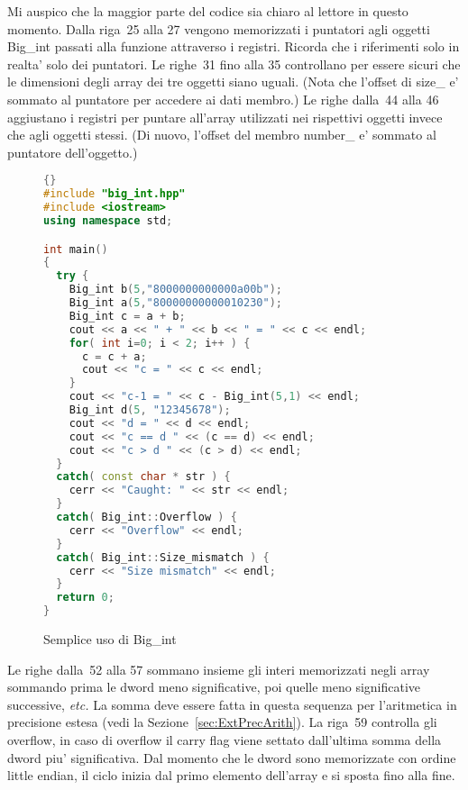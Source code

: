 Mi auspico che la maggior parte del codice sia chiaro al lettore in 
questo momento. Dalla riga~25 alla 27 vengono memorizzati i puntatori
agli oggetti {\code Big\_int} passati alla funzione attraverso i
registri. Ricorda che i riferimenti solo in realta' solo dei puntatori.
Le righe~31 fino alla 35 controllano per essere sicuri che le dimensioni
degli array dei tre oggetti siano uguali. (Nota che l'offset di
{\code size\_} e' sommato al puntatore per accedere ai dati membro.)
Le righe dalla~44 alla 46 aggiustano i registri per puntare all'array
utilizzati nei rispettivi oggetti invece che agli oggetti stessi. (Di
nuovo, l'offset del membro {\code number\_} e' sommato al puntatore
dell'oggetto.)

\begin{figure}[tp]
\begin{lstlisting}[language=C++, frame=tlrb]{}
#include "big_int.hpp"
#include <iostream>
using namespace std;

int main()
{
  try {
    Big_int b(5,"8000000000000a00b");
    Big_int a(5,"80000000000010230");
    Big_int c = a + b;
    cout << a << " + " << b << " = " << c << endl;
    for( int i=0; i < 2; i++ ) {
      c = c + a;
      cout << "c = " << c << endl;
    }
    cout << "c-1 = " << c - Big_int(5,1) << endl;
    Big_int d(5, "12345678");
    cout << "d = " << d << endl;
    cout << "c == d " << (c == d) << endl;
    cout << "c > d " << (c > d) << endl;
  }
  catch( const char * str ) {
    cerr << "Caught: " << str << endl;
  }
  catch( Big_int::Overflow ) {
    cerr << "Overflow" << endl;
  }
  catch( Big_int::Size_mismatch ) {
    cerr << "Size mismatch" << endl;
  }
  return 0;
}
\end{lstlisting}
\caption{ Semplice uso di {\code Big\_int} \label{fig:BigIntEx}}
\end{figure}

Le righe dalla~52 alla 57 sommano insieme gli interi memorizzati negli array
sommando prima le dword meno significative, poi quelle meno significative
successive, \emph{etc.} La somma deve essere fatta in questa sequenza per
l'aritmetica in precisione estesa (vedi la Sezione~\ref{sec:ExtPrecArith}). La
riga~59 controlla gli overflow, in caso di overflow il carry flag viene
settato dall'ultima somma della dword piu' significativa. Dal momento che
le dword sono memorizzate con ordine little endian, il ciclo inizia dal 
primo elemento dell'array e si sposta fino alla fine. 
 
